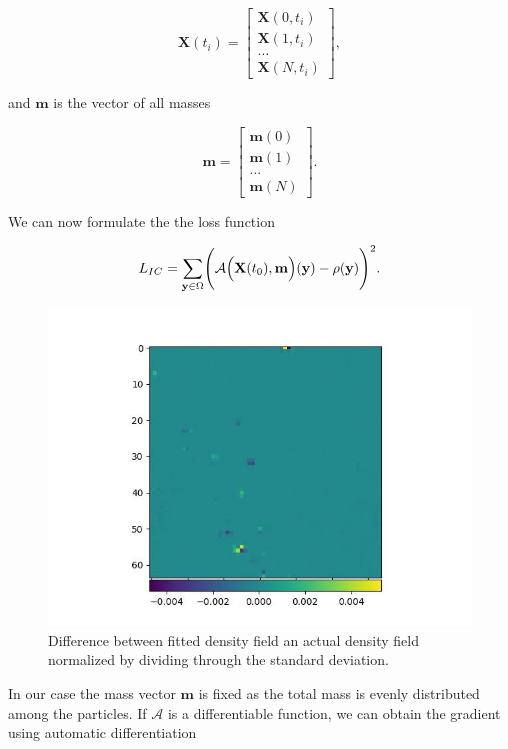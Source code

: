 \documentclass{article}
\begin{document}
{\begin{appendices}
\begin{equation}
    \mathbf{X}(t_i) = \begin{bmatrix}
        \mathbf{X}(0, t_i) \\
        \mathbf{X}(1, t_i) \\
        \dots  \\
        \mathbf{X}(N, t_i)
    \end{bmatrix},
\end{equation}

and $\mathbf{m}$ is the vector of all masses

\begin{equation}
    \mathbf{m}= \begin{bmatrix}
        \mathbf{m}(0) \\
        \mathbf{m}(1) \\
        \dots  \\
        \mathbf{m}(N)
    \end{bmatrix}.
\end{equation}

We can now formulate the the loss function

\begin{equation}
    L_{IC} = \sum_{\mathbf{y} \in \Omega} \Biggl(\mathcal{A}\Bigl(\mathbf{X}(t_0), \mathbf{m}\Bigr)(\mathbf{y}) - \rho(\mathbf{y})\Biggr)^2.
\end{equation}

\begin{figure}[h]
    \centering
    \includegraphics[width=0.5\linewidth]{img/cmp.jpg}
    \caption{Difference between fitted density field an actual density field normalized by dividing through the standard deviation.}
    \label{fig:field-fit}
\end{figure}

In our case the mass vector $\mathbf{m}$ is fixed as the total mass is evenly distributed among the particles. If $\mathcal{A}$ is a differentiable function, we can obtain the gradient using automatic differentiation 


\end{appendices}}
\end{document}
